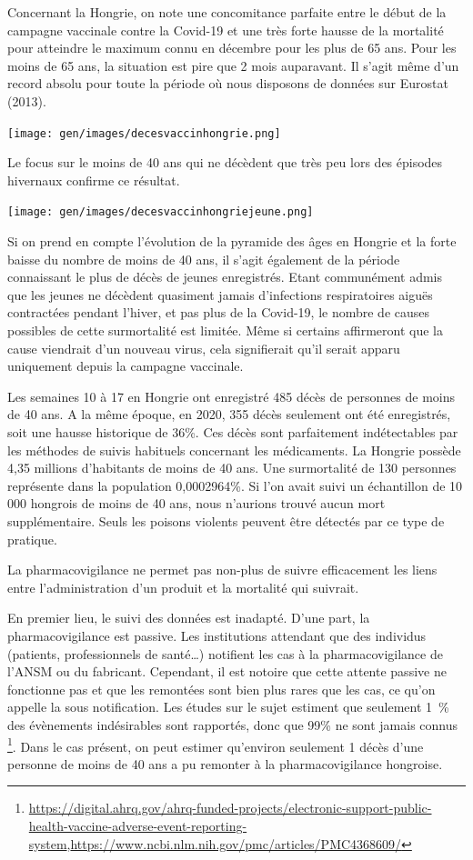 \documentclass[
]{article}
\begin{document}
Concernant la Hongrie, on note une concomitance parfaite entre le début
de la campagne vaccinale contre la Covid-19 et une très forte hausse de
la mortalité pour atteindre le maximum connu en décembre pour les plus
de 65 ans. Pour les moins de 65 ans, la situation est pire que 2 mois
auparavant. Il s'agit même d'un record absolu pour toute la période où
nous disposons de données sur Eurostat (2013).

\texttt{[image: gen/images/decesvaccinhongrie.png]}

Le focus sur le moins de 40 ans qui ne décèdent que très peu lors des
épisodes hivernaux confirme ce résultat.

\texttt{[image: gen/images/decesvaccinhongriejeune.png]}

Si on prend en compte l'évolution de la pyramide des âges en Hongrie et
la forte baisse du nombre de moins de 40 ans, il s'agit également de la
période connaissant le plus de décès de jeunes enregistrés. Etant
communément admis que les jeunes ne décèdent quasiment jamais
d'infections respiratoires aiguës contractées pendant l'hiver, et pas
plus de la Covid-19, le nombre de causes possibles de cette surmortalité
est limitée. Même si certains affirmeront que la cause viendrait d'un
nouveau virus, cela signifierait qu'il serait apparu uniquement depuis
la campagne vaccinale.

Les semaines 10 à 17 en Hongrie ont enregistré 485 décès de personnes de
moins de 40 ans. A la même époque, en 2020, 355 décès seulement ont été
enregistrés, soit une hausse historique de 36\%. Ces décès sont
parfaitement indétectables par les méthodes de suivis habituels
concernant les médicaments. La Hongrie possède 4,35 millions d'habitants
de moins de 40 ans. Une surmortalité de 130 personnes représente dans la
population 0,0002964\%. Si l'on avait suivi un échantillon de 10 000
hongrois de moins de 40 ans, nous n'aurions trouvé aucun mort
supplémentaire. Seuls les poisons violents peuvent être détectés par ce
type de pratique.

La pharmacovigilance ne permet pas non-plus de suivre efficacement les
liens entre l'administration d'un produit et la mortalité qui suivrait.

En premier lieu, le suivi des données est inadapté. D'une part, la
pharmacovigilance est passive. Les institutions attendant que des
individus (patients, professionnels de santé\ldots) notifient les cas à
la pharmacovigilance de l'ANSM ou du fabricant. Cependant, il est
notoire que cette attente passive ne fonctionne pas et que les remontées
sont bien plus rares que les cas, ce qu'on appelle la sous notification.
Les études sur le sujet estiment que seulement 1~\% des évènements
indésirables sont rapportés, donc que 99\% ne sont jamais connus
\footnote{\url{https://digital.ahrq.gov/ahrq-funded-projects/electronic-support-public-health-vaccine-adverse-event-reporting-system},\url{https://www.ncbi.nlm.nih.gov/pmc/articles/PMC4368609/}}.
Dans le cas présent, on peut estimer qu'environ seulement 1 décès d'une
personne de moins de 40 ans a pu remonter à la pharmacovigilance
hongroise.
\end{document}
